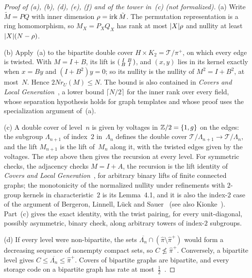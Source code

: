 \begin{proof}[Proof of (a), (b), (d), (e), (f) and of the tower in~(c) (not formalized)]
(a) Write $\tilde M=PQ$ with inner dimension $\rho=\operatorname{irk}\tilde M$. The permutation representation is a ring homomorphism, so
$M_X=P_XQ_X$ has rank at most $\lvert X \rvert\rho$ and nullity at least $\lvert X \rvert(N-\rho)$.

(b) Apply~(a) to the bipartite double cover $H\times K_2=\mathcal T/\pi^+$, on which every edge is twisted. With $M=I+B$, its
lift is $\begin{psmallmatrix}I&B\\B&I\end{psmallmatrix}$, and $(x,y)$ lies in its kernel exactly when $x=By$ and $(I+B^2)y=0$;
so its nullity is the nullity of $M^2=I+B^2$, at most~$N$. Hence $2Nr_U(M)\le N$. The bound is also contained in
\emph{Covers and Local Generation}~\cite[Proposition~3.2]{Covers2026}, a lower bound $\lceil N/2\rceil$ for the inner rank
over every field, whose separation hypothesis holds for graph templates and whose proof uses the specialization argument
of~(a).

(c) A double cover of level~$n$ is given by voltages in $\mathbb{Z}/2=\{1,g\}$ on the edges: the subgroup $\Lambda_{n+1}$ of
index~$2$ in~$\Lambda_n$ defines the double cover $\mathcal T/\Lambda_{n+1}\to\mathcal T/\Lambda_n$, and the lift $M_{n+1}$ is
the lift of~$M_n$ along it, with the twisted edges given by the voltages. The step above then gives the recursion at every
level. For symmetric checks, the
adjacency checks $M=I+A$, the recursion is the lift identity of \emph{Covers and Local Generation}~\cite[Lemma~9.1]{Covers2026},
for arbitrary binary lifts of finite connected graphs; the monotonicity of the normalized nullity under refinements with
$2$-group kernels in characteristic~$2$ is its Lemma~4.1, and it is also the index-$2$ case of the argument of Bergeron,
Linnell, Lück and Sauer~\cite[Lemma~4.1 and Theorem~1.6]{BLLS2014} (see also Kionke~\cite[Lemma~2.6]{Kionke2017}). Part~(c)
gives the exact identity, with the twist pairing, for every unit-diagonal, possibly asymmetric, binary check, along arbitrary
towers of index-$2$ subgroups.

(d) If every level were non-bipartite, the sets $\overline{\Lambda_n}\cap(\hat\pi\setminus\hat\pi^+)$ would form a decreasing
sequence of nonempty compact sets, so $C\not\le\hat\pi^+$. Conversely, a bipartite level gives
$C\le\overline{\Lambda_n}\le\hat\pi^+$. Covers of bipartite graphs are bipartite, and every storage code on a bipartite graph has
rate at most~$\frac12$~\cite[Corollary~6.9]{FourthPaper2026}.


\end{proof}
